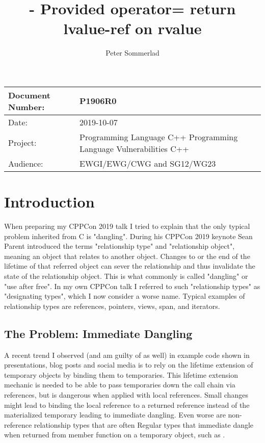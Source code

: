 \documentclass[ebook,11pt,article]{memoir}
\title{\papernumber{} - Provided operator= return lvalue-ref on rvalue}
\author{Peter Sommerlad}
\date{\paperdate}                %
\newcommand{\papernumber}{P1906R0}
\newcommand{\paperdate}{2019-10-07}
\begin{document}
\maketitle
\begin{center}
\begin{tabular}[t]{|l|p{8cm}|}\hline 
Document Number:&  \papernumber \\\hline
Date: & \paperdate \\\hline
Project: & Programming Language C++ \newline Programming Language Vulnerabilities C++\\\hline 
Audience: & EWGI/EWG/CWG and SG12/WG23\\\hline
\end{tabular}
\end{center}


\chapter{Introduction}

When preparing my CPPCon 2019 talk I tried to explain that the only typical problem inherited from C is "dangling".
During his CPPCon 2019 keynote Sean Parent introduced the terms "relationship type" and "relationship object", meaning an object that relates to another object. Changes to or the end of the lifetime of that referred object can sever the relationship and thus invalidate the state of the relationship object.
This is what commonly is called "dangling" or "use after free". In my own CPPCon talk I referred to such "relationship types" as "designating types", which I now consider a worse name.
Typical examples of relationship types are references, pointers, views, span, and iterators.

\section{The Problem: Immediate Dangling}

A recent trend I observed (and am guilty of as well) in example code shown in presentations, blog posts and social media is to rely on the lifetime extension of temporary objects by binding them to temporaries.
This lifetime extension mechanic is needed to be able to pass temporaries down the call chain via references, but is dangerous when applied with local references.
Small changes might lead to binding the local reference to a returned reference instead of the materialized temporary leading to immediate dangling.
Even worse are non-reference relationship types that are often Regular types that immediate dangle when returned from member function on a temporary object, such as .
\end{document}
